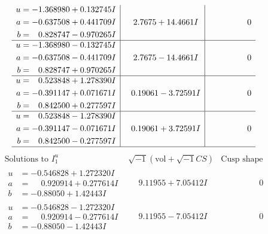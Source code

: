 \documentclass[1p]{elsarticle_modified}
\theoremstyle{definition}
\newcommand{\I}{\sqrt{-1}}
\begin{document}
$$\begin{array}{c|c|c}
\begin{aligned}
u &= -1.368980 + 0.132745 I \\
a &= -0.637508 + 0.441709 I \\
b &= \phantom{-}0.828747 - 0.970265 I\end{aligned}
 & \phantom{-}2.7675 + 14.4661 I & \phantom{-0.000000 } 0 \\ \hline\begin{aligned}
u &= -1.368980 - 0.132745 I \\
a &= -0.637508 - 0.441709 I \\
b &= \phantom{-}0.828747 + 0.970265 I\end{aligned}
 & \phantom{-}2.7675 - 14.4661 I & \phantom{-0.000000 } 0 \\ \hline\begin{aligned}
u &= \phantom{-}0.523848 + 1.278390 I \\
a &= -0.391147 + 0.071671 I \\
b &= \phantom{-}0.842500 + 0.277597 I\end{aligned}
 & \phantom{-}0.19061 - 3.72591 I & \phantom{-0.000000 } 0 \\ \hline\begin{aligned}
u &= \phantom{-}0.523848 - 1.278390 I \\
a &= -0.391147 - 0.071671 I \\
b &= \phantom{-}0.842500 - 0.277597 I\end{aligned}
 & \phantom{-}0.19061 + 3.72591 I & \phantom{-0.000000 } 0\\
 \hline 
 \end{array}$$\newpage$$\begin{array}{c|c|c}  
\text{Solutions to }I^u_{1}& \I (\text{vol} + \sqrt{-1}CS) & \text{Cusp shape}\\
 \hline 
\begin{aligned}
u &= -0.546828 + 1.272320 I \\
a &= \phantom{-}0.920914 + 0.277614 I \\
b &= -0.88050 + 1.42443 I\end{aligned}
 & \phantom{-}9.11955 + 7.05412 I & \phantom{-0.000000 } 0 \\ \hline\begin{aligned}
u &= -0.546828 - 1.272320 I \\
a &= \phantom{-}0.920914 - 0.277614 I \\
b &= -0.88050 - 1.42443 I\end{aligned}
 & \phantom{-}9.11955 - 7.05412 I & \phantom{-0.000000 } 0 \\ \hline\begin{aligned}

\end{aligned}
\end{array}$$
\end{document}
